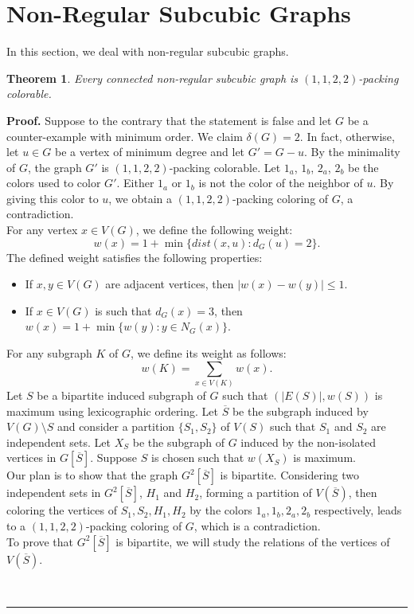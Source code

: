 \documentclass[12pt, oneside]{scrartcl}
\newtheorem{theorem}{Theorem}%
\newenvironment{proof}[1][Proof]{\textbf{#1.} }{\ \rule{0.5em}{0.5em}}
\begin{document}
\section{Non-Regular Subcubic Graphs} 
In this section, we deal with non-regular subcubic graphs.
\begin{theorem}
Every connected non-regular subcubic graph is $(1,1,2,2)$-packing colorable.
\end{theorem}
\begin{proof}
Suppose to the contrary that the statement is false and let $G$ be a counter-example with minimum order. We claim $\delta(G)=2$. In fact, otherwise, let $u\in G$ be a vertex of minimum degree and let $G'=G-u$. By the minimality of $G$, the graph $G'$ is $(1,1,2,2)$-packing colorable. Let $1_a$, $1_b$, $2_a$, $2_b$ be the colors used to color $G'$. Either $1_a$ or $1_b$ is not the color of the neighbor of $u$. By giving this color to $u$, we obtain a $(1,1,2,2)$-packing coloring of $G$, a contradiction.\\
For any vertex $x\in V(G)$, we define the following weight:
$$w(x)=1+\min \{dist(x,u): d_G(u)=2\}.$$
The defined weight satisfies the following properties:\begin{itemize}
\item[(P1)] If $x,y\in V(G)$ are adjacent vertices, then $|w(x)-w(y)|\leq 1$.
\item[(P2)] If $x\in V(G)$ is such that $d_G(x)=3$, then $w(x)=1+\min \{w(y): y\in N_G(x)\}$.
\end{itemize}
For any subgraph $K$ of $G$, we define its weight as follows:
$$w(K)=\displaystyle \sum_{x\in V(K)} w(x).$$
Let $S$ be a bipartite induced subgraph of $G$ such that $(|E(S)|,w(S))$ is maximum using lexicographic ordering. Let $\overline{S}$ be the subgraph induced by $V(G)\setminus S$ and consider a partition $\{S_1,S_2\}$ of $V(S)$ such that $S_1$ and $S_2$ are independent sets. Let $X_S$ be the subgraph of $G$ induced by the non-isolated vertices in $G[\overline{S}]$. Suppose $S$ is chosen such that $w(X_S)$ is maximum.\\
Our plan is to show that the graph $G^2[\overline{S}]$ is bipartite. Considering two independent sets in $G^2[\overline{S}]$, $H_1$ and $H_2$, forming a partition of $V(\overline{S})$, then coloring the vertices of $S_1,S_2,H_1,H_2$ by the colors $1_a,1_b,2_a,2_b$ respectively, leads to a $(1,1,2,2)$-packing coloring of $G$, which is a contradiction.\\
To prove that $G^2[\overline{S}]$ is bipartite, we will study the relations of the vertices of $V(\overline{S})$.

\end{proof}
\end{document}
